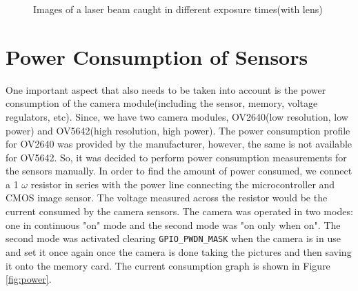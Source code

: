 \begin{figure}[ht]
\begin{subfigure}{0.5\textwidth}
    \end{subfigure}    
    \caption{Images of a laser beam caught in different exposure times(with lens)}
    \label{fig:exptests}
    \end{figure}
    
\section{Power Consumption of Sensors}
 One important aspect that also needs to be taken into account is the power consumption of the camera module(including the sensor, memory, voltage regulators, etc). Since, we have two camera modules, OV2640(low resolution, low power) and OV5642(high resolution, high power). The power consumption profile for OV2640 was provided by the manufacturer, however, the same is not available for OV5642. So, it was decided to perform power consumption measurements for the sensors manually. In order to find the amount of power consumed, we connect a 1 $\omega$ resistor in series with the power line connecting the microcontroller and CMOS image sensor. The voltage measured across the resistor would be the current consumed by the camera sensors. The camera was operated in two modes: one in continuous "on" mode and the second mode was "on only when on". The second mode was activated clearing \texttt{GPIO\_PWDN\_MASK} when the camera is in use and set it once again once the camera is done taking the pictures and then saving it onto the memory card. The current consumption graph is shown in Figure \ref{fig:power}.
 
